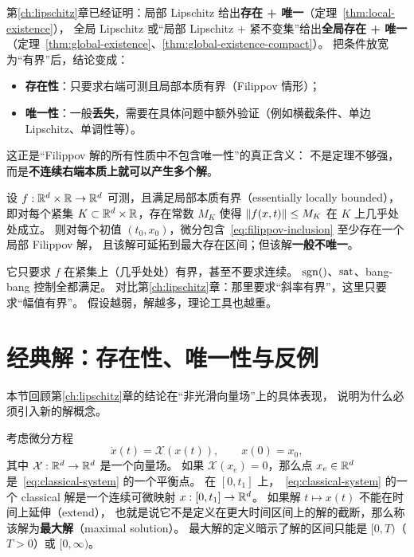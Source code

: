 第\ref{ch:lipschitz}章已经证明：局部 Lipschitz 给出\textbf{存在 + 唯一}（定理~\ref{thm:local-existence}），
全局 Lipschitz 或“局部 Lipschitz + 紧不变集”给出\textbf{全局存在 + 唯一}（定理~\ref{thm:global-existence}、\ref{thm:global-existence-compact}）。
把条件放宽为“有界”后，结论变成：
\begin{itemize}
  \item \textbf{存在性}：只要求右端可测且局部本质有界（Filippov 情形）；
  \item \textbf{唯一性}：一般\textbf{丢失}，需要在具体问题中额外验证（例如横截条件、单边 Lipschitz、单调性等）。
\end{itemize}
这正是“Filippov 解的所有性质中不包含唯一性”的真正含义：
不是定理不够强，而是\textbf{不连续右端本质上就可以产生多个解}。

\begin{theorem}\label{thm:filippov-existence}
  设 $f:\mathbb{R}^d\times\mathbb{R}\to\mathbb{R}^d$ 可测，且满足局部本质有界（essentially locally bounded），
  即对每个紧集 $K\subset\mathbb{R}^d\times\mathbb{R}$，存在常数 $M_K$ 使得 $\left\lVert f(x,t)\right\rVert\le M_K$ 在 $K$ 上几乎处处成立。
  则对每个初值 $(t_0,x_0)$，微分包含~\eqref{eq:filippov-inclusion} 至少存在一个局部 Filippov 解，
  且该解可延拓到最大存在区间；但该解\textbf{一般不唯一}。
  \cite{cortesDiscontinuousDynamicalSystems2008}
\end{theorem}

\begin{remark}[“有界”这一假设有多弱]
  它只要求 $f$ 在紧集上（几乎处处）有界，甚至不要求连续。
  $\sgn$、$\operatorname{sat}$、bang-bang 控制全都满足。
  对比第\ref{ch:lipschitz}章：那里要求“斜率有界”，这里只要求“幅值有界”。
  假设越弱，解越多，理论工具也越重。
\end{remark}

\section{经典解：存在性、唯一性与反例}\label{sec:classical-examples}

本节回顾第\ref{ch:lipschitz}章的结论在“非光滑向量场”上的具体表现，
说明为什么必须引入新的解概念。

考虑微分方程
\begin{equation}\label{eq:classical-system}
  \dot{x}(t)=\mathcal{X}(x(t)),\qquad x(0)=x_0,
\end{equation}
其中 $\mathcal{X}:\mathbb{R}^d\to\mathbb{R}^d$ 是一个向量场。
如果 $\mathcal{X}(x_e)=0$，那么点 $x_e\in\mathbb{R}^d$ 是~\eqref{eq:classical-system} 的一个平衡点。
在 $[0,t_1]$ 上，~\eqref{eq:classical-system} 的一个 classical 解是一个连续可微映射 $x:[0,t_1]\to\mathbb{R}^d$。
如果解 $t\mapsto x(t)$ 不能在时间上延伸（extend），
也就是说它不是定义在更大时间区间上的解的截断，那么称该解为\textbf{最大解}（maximal solution）。
最大解的定义暗示了解的区间只能是 $[0,T)$（$T>0$）或 $[0,\infty)$。

